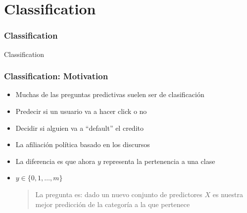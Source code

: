 \documentclass[
  shownotes,
  xcolor={svgnames},
  hyperref={colorlinks,citecolor=DarkBlue,linkcolor=DarkRed,urlcolor=DarkBlue}
  , aspectratio=169]{beamer}
\begin{document}
\section{Classification}
\begin{frame}[fragile]
\frametitle{Classification}


\centering
{\huge \textcolor{andesred}{Classification}}



\end{frame}
\begin{frame}[fragile]
\frametitle{Classification: Motivation}

\begin{itemize}
  \item Muchas de las preguntas predictivas suelen ser de clasificación
  \medskip
  \pause
  \item Predecir si un usuario va a hacer click o no
  \medskip
  \item Decidir si alguien va a ``default'' el credito
  \medskip
  \item La afiliación política basado en los discursos
  \medskip
  \item La diferencia es que ahora $y$ representa la pertenencia a una clase
  \medskip
  \item $y\in \{0,1,\dots,m\}$ 
    \begin{quote}
      La pregunta es: dado un nuevo conjunto de predictores $X$ es nuestra mejor predicción de la categoría a la que pertenece  
    \end{quote}
\end{itemize}



\end{frame}

\end{document}
